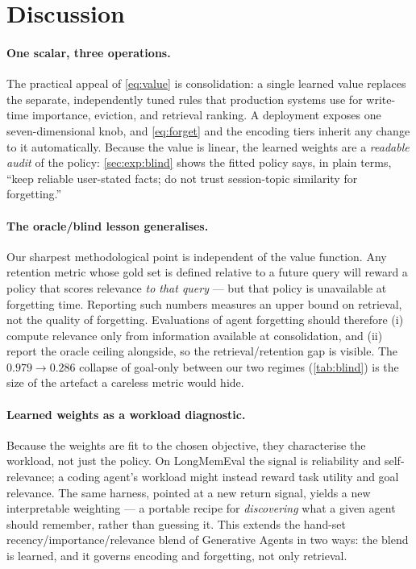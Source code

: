 \section{Discussion}
\label{sec:discussion}

\paragraph{One scalar, three operations.}
The practical appeal of \cref{eq:value} is consolidation: a single
learned value replaces the separate, independently tuned rules that
production systems use for write-time importance, eviction, and
retrieval ranking. A deployment exposes one seven-dimensional knob, and
\cref{eq:forget} and the encoding tiers inherit any change to it
automatically. Because the value is linear, the learned weights are a
\emph{readable audit} of the policy: \cref{sec:exp:blind} shows the
fitted policy says, in plain terms, ``keep reliable user-stated facts;
do not trust session-topic similarity for forgetting.''

\paragraph{The oracle/blind lesson generalises.}
Our sharpest methodological point is independent of the value function.
Any retention metric whose gold set is defined relative to a future
query will reward a policy that scores relevance \emph{to that query}
--- but that policy is unavailable at forgetting time. Reporting such
numbers measures an upper bound on retrieval, not the quality of
forgetting. Evaluations of agent forgetting should therefore (i) compute
relevance only from information available at consolidation, and (ii)
report the oracle ceiling alongside, so the retrieval/retention gap is
visible. The $0.979 \rightarrow 0.286$ collapse of goal-only between our
two regimes (\cref{tab:blind}) is the size of the artefact a careless
metric would hide.

\paragraph{Learned weights as a workload diagnostic.}
Because the weights are fit to the chosen objective, they characterise the
workload, not just the policy. On LongMemEval the signal is reliability
and self-relevance; a coding agent's workload might instead reward task
utility and goal relevance. The same harness, pointed at a new return
signal, yields a new interpretable weighting --- a portable recipe for
\emph{discovering} what a given agent should remember, rather than
guessing it. This extends the hand-set recency/importance/relevance blend
of Generative Agents \citep{park2023generative} in two ways: the blend is
learned, and it governs encoding and forgetting, not only retrieval.
